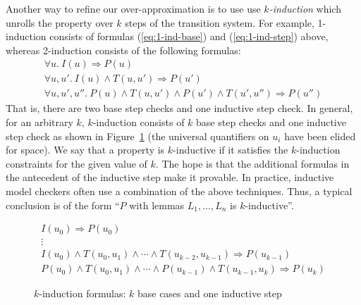 Another way to refine our over-approximation is to use use {\em
  $k$-induction} which unrolls the property over $k$ steps of the
transition system. For example, 1-induction consists of formulas
(\ref{eq:1-ind-base}) and (\ref{eq:1-ind-step}) above, whereas
2-induction consists of the following formulas:
\begin{gather*}
\forall u.~ I(u) \Rightarrow P(u) \\
\forall u, u'.~ I(u) \land T(u, u') \Rightarrow P(u') \\
\forall u, u', u''.~ P(u) \land T(u, u') \land P(u') \land T(u',
  u'') \Rightarrow P(u'')
\end{gather*}
That is, there are two base step checks and one inductive step check.
In general, for an arbitrary $k$, $k$-induction consists of $k$
base step checks and one inductive step check as shown in
Figure~\ref{fig:k-induction} (the universal quantifiers on $u_i$ have
been elided for space). We say that a property is $k$-inductive if it
satisfies the $k$-induction constraints for the given value of $k$.
The hope is that the additional formulas in the antecedent of the
inductive step make it provable.
In practice, inductive model checkers often use a combination of the
above techniques. Thus, a typical conclusion is of the form ``$P$ with
lemmas $L_1, \ldots, L_n$ is $k$-inductive''.

\begin{figure}
\begin{gather*}
I(u_0) \Rightarrow P(u_0) \\[-2pt]
%
\vdots \\[2pt]
%
I(u_0) \land T(u_0, u_1) \land \cdots \land T(u_{k-2}, u_{k-1})
\Rightarrow P(u_{k-1}) \\[2pt]
%
P(u_0) \land T(u_0, u_1) \land \cdots \land P(u_{k-1}) \land
T(u_{k-1}, u_k) \Rightarrow P(u_k)
\end{gather*}
\caption{$k$-induction formulas: $k$ base cases and one inductive
  step}
\label{fig:k-induction}
\end{figure}





